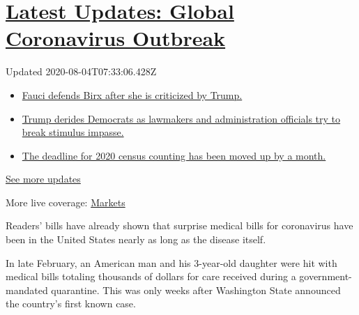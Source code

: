 \hypertarget{latest-updates-global-coronavirus-outbreak}{%
\section{\texorpdfstring{\href{https://www.nytimes3xbfgragh.onion/2020/08/03/world/coronavirus-covid-19.html?action=click\&pgtype=Article\&state=default\&region=MAIN_CONTENT_1\&context=storylines_live_updates}{Latest
Updates: Global Coronavirus
Outbreak}}{Latest Updates: Global Coronavirus Outbreak}}\label{latest-updates-global-coronavirus-outbreak}}

Updated 2020-08-04T07:33:06.428Z

\begin{itemize}
\tightlist
\item
  \href{https://www.nytimes3xbfgragh.onion/2020/08/03/world/coronavirus-covid-19.html?action=click\&pgtype=Article\&state=default\&region=MAIN_CONTENT_1\&context=storylines_live_updates\#link-4547638f}{Fauci
  defends Birx after she is criticized by Trump.}
\item
  \href{https://www.nytimes3xbfgragh.onion/2020/08/03/world/coronavirus-covid-19.html?action=click\&pgtype=Article\&state=default\&region=MAIN_CONTENT_1\&context=storylines_live_updates\#link-15e7f995}{Trump
  derides Democrats as lawmakers and administration officials try to
  break stimulus impasse.}
\item
  \href{https://www.nytimes3xbfgragh.onion/2020/08/03/world/coronavirus-covid-19.html?action=click\&pgtype=Article\&state=default\&region=MAIN_CONTENT_1\&context=storylines_live_updates\#link-e5a2cda}{The
  deadline for 2020 census counting has been moved up by a month.}
\end{itemize}

\href{https://www.nytimes3xbfgragh.onion/2020/08/03/world/coronavirus-covid-19.html?action=click\&pgtype=Article\&state=default\&region=MAIN_CONTENT_1\&context=storylines_live_updates}{See
more updates}

More live coverage:
\href{https://www.nytimes3xbfgragh.onion/live/2020/08/03/business/stock-market-today-coronavirus?action=click\&pgtype=Article\&state=default\&region=MAIN_CONTENT_1\&context=storylines_live_updates}{Markets}

Readers' bills have already shown that surprise medical bills for
coronavirus have been in the United States nearly as long as the disease
itself.

In late February, an American man and his 3-year-old daughter were hit
with medical bills totaling thousands of dollars for care received
during a government-mandated quarantine. This was only weeks after
Washington State announced the country's first known case.

